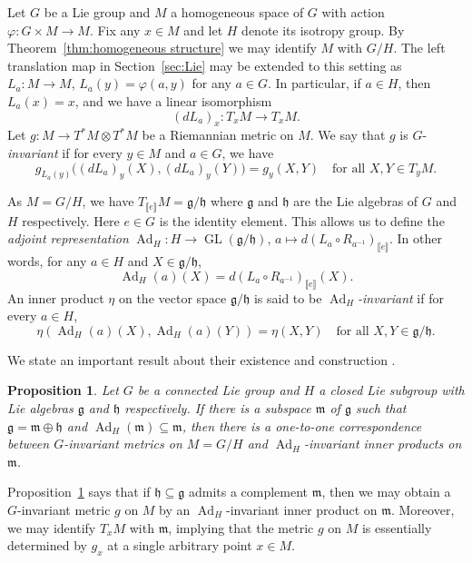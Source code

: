 \documentclass[11pt,reqno]{amsart}%
\newtheorem{proposition}[theorem]{Proposition}
\theoremstyle{definition}
\theoremstyle{remark}
\newcommand{\lb}{\llbracket}
\newcommand{\rb}{\rrbracket}
\DeclareMathOperator{\GL}{GL}
\DeclareMathOperator{\Ad}{Ad}
\begin{document}
Let $G$ be a Lie group and $M$ a homogeneous space of $G$ with action $\varphi: G\times M \to M$. Fix any $x\in M$ and let $H$ denote its isotropy group. By Theorem~\ref{thm:homogeneous structure} we may identify $M$ with $G/H$.  The left translation map in Section~\ref{sec:Lie} may be extended to this setting as $L_a : M \to M$, $L_a(y) =\varphi(a,y)$ for any  $a \in G$. In particular, if $a\in H$, then $L_a(x) = x$, and we have a linear isomorphism
\[
(dL_a)_x : T_xM \to T_xM.
\]
Let $g: M \to T^\ast M \otimes T^\ast M$ be a Riemannian metric on $M$. We say that $g$ is $G$-\emph{invariant} if for every $y\in M$ and $a\in G$, we have
\[
g_{L_a(y)}\bigl((dL_a)_y(X), (dL_a)_y(Y)\bigr) = g_y (X,Y) \quad \text{for all }  X,Y\in T_yM.
\]

As $M  = G/H$, we have $T_{\lb e \rb} M  = \mathfrak{g}/\mathfrak{h}$ where $\mathfrak{g}$ and $\mathfrak{h}$ are the Lie algebras of $G$ and $H$ respectively. Here $e\in G$ is the identity element. This allows us to define the \emph{adjoint representation}
$\Ad_H: H \to \GL(\mathfrak{g}/\mathfrak{h})$, $a \mapsto d(L_a \circ R_{a^{-1}})_{\lb e \rb}$. In other words, for any $a \in H$ and $X\in \mathfrak{g}/\mathfrak{h}$,
\[
\Ad_H (a) (X) = d (L_a\circ R_{a^{-1}} )_{\lb e \rb}(X).
\]
An inner product $\eta$ on the vector space $\mathfrak{g}/\mathfrak{h}$ is said to be \emph{$\Ad_H$-invariant} if for every $a\in H$,
\[
\eta (\Ad_H(a)(X),\Ad_H(a)(Y)) = \eta (X,Y) \quad \text{for all } X,Y\in \mathfrak{g}/\mathfrak{h}.
\]


We state an important result about their existence and construction \cite[Proposition 3.16]{CE2008}.

\begin{proposition}\label{prop:metric inner product correspondence}
Let $G$ be a connected Lie group and  $H$ a closed Lie subgroup with Lie algebras $\mathfrak{g}$ and $\mathfrak{h}$ respectively. If there is a subspace $\mathfrak{m}$ of $\mathfrak{g}$ such that $\mathfrak{g} = \mathfrak{m} \oplus \mathfrak{h}$ and $\Ad_H (\mathfrak{m}) \subseteq \mathfrak{m}$, then there is a one-to-one correspondence between $G$-invariant metrics on $M = G/H$ and $\Ad_H$-invariant inner products on  $\mathfrak{m}$.
\end{proposition} 
Proposition~\ref{prop:metric inner product correspondence} says that if $\mathfrak{h}\subseteq \mathfrak{g}$ admits a complement $\mathfrak{m}$, then we may obtain a $G$-invariant metric $g$ on $M$ by an $\Ad_H$-invariant  inner product on $\mathfrak{m}$. Moreover, we may identify $T_xM$ with $\mathfrak{m}$, implying that the metric $g$ on $M$ is essentially determined by $g_x$ at a single arbitrary point $x \in M$. 
\end{document}
